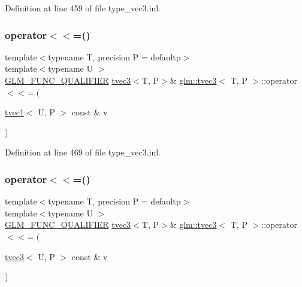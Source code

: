 Definition at line 459 of file type\+\_\+vec3.\+inl.

\mbox{\label{structglm_1_1tvec3_a3eadadf25a3ef2e34bb1b6b7f192384a}} 
\subsubsection{\texorpdfstring{operator$<$$<$=()}{operator<<=()}\hspace{0.1cm}{\footnotesize\ttfamily [5/6]}}
{\footnotesize\ttfamily template$<$typename T, precision P = defaultp$>$ \\
template$<$typename U $>$ \\
\mbox{\hyperlink{setup_8hpp_a33fdea6f91c5f834105f7415e2a64407}{G\+L\+M\+\_\+\+F\+U\+N\+C\+\_\+\+Q\+U\+A\+L\+I\+F\+I\+ER}} \mbox{\hyperlink{structglm_1_1tvec3}{tvec3}}$<$T, P$>$\& \mbox{\hyperlink{structglm_1_1tvec3}{glm\+::tvec3}}$<$ T, P $>$\+::operator$<$$<$= (\begin{DoxyParamCaption}\item[{\mbox{\hyperlink{structglm_1_1tvec1}{tvec1}}$<$ U, P $>$ const \&}]{v }\end{DoxyParamCaption})}



Definition at line 469 of file type\+\_\+vec3.\+inl.

\mbox{\label{structglm_1_1tvec3_a7c12511c3769c0e7822bc884af40f3a2}} 
\subsubsection{\texorpdfstring{operator$<$$<$=()}{operator<<=()}\hspace{0.1cm}{\footnotesize\ttfamily [6/6]}}
{\footnotesize\ttfamily template$<$typename T, precision P = defaultp$>$ \\
template$<$typename U $>$ \\
\mbox{\hyperlink{setup_8hpp_a33fdea6f91c5f834105f7415e2a64407}{G\+L\+M\+\_\+\+F\+U\+N\+C\+\_\+\+Q\+U\+A\+L\+I\+F\+I\+ER}} \mbox{\hyperlink{structglm_1_1tvec3}{tvec3}}$<$T, P$>$\& \mbox{\hyperlink{structglm_1_1tvec3}{glm\+::tvec3}}$<$ T, P $>$\+::operator$<$$<$= (\begin{DoxyParamCaption}\item[{\mbox{\hyperlink{structglm_1_1tvec3}{tvec3}}$<$ U, P $>$ const \&}]{v }\end{DoxyParamCaption})}



